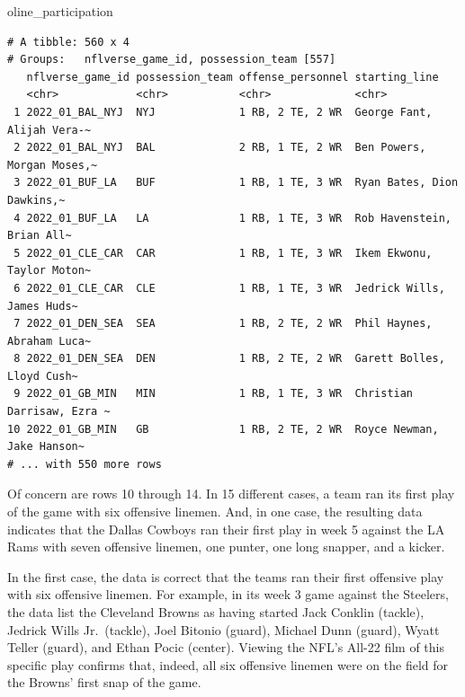 \documentclass[
  letterpaper,
]{krantz}
\newenvironment{Shaded}{\begin{snugshade}}{\end{snugshade}}
\newcommand{\NormalTok}[1]{\textcolor[rgb]{0.00,0.23,0.31}{#1}}
\begin{document}
\begin{Shaded}
\begin{Highlighting}[]
\NormalTok{oline\_participation}
\end{Highlighting}
\end{Shaded}

\begin{verbatim}
# A tibble: 560 x 4
# Groups:   nflverse_game_id, possession_team [557]
   nflverse_game_id possession_team offense_personnel starting_line             
   <chr>            <chr>           <chr>             <chr>                     
 1 2022_01_BAL_NYJ  NYJ             1 RB, 2 TE, 2 WR  George Fant, Alijah Vera-~
 2 2022_01_BAL_NYJ  BAL             2 RB, 1 TE, 2 WR  Ben Powers, Morgan Moses,~
 3 2022_01_BUF_LA   BUF             1 RB, 1 TE, 3 WR  Ryan Bates, Dion Dawkins,~
 4 2022_01_BUF_LA   LA              1 RB, 1 TE, 3 WR  Rob Havenstein, Brian All~
 5 2022_01_CLE_CAR  CAR             1 RB, 1 TE, 3 WR  Ikem Ekwonu, Taylor Moton~
 6 2022_01_CLE_CAR  CLE             1 RB, 1 TE, 3 WR  Jedrick Wills, James Huds~
 7 2022_01_DEN_SEA  SEA             1 RB, 2 TE, 2 WR  Phil Haynes, Abraham Luca~
 8 2022_01_DEN_SEA  DEN             1 RB, 2 TE, 2 WR  Garett Bolles, Lloyd Cush~
 9 2022_01_GB_MIN   MIN             1 RB, 1 TE, 3 WR  Christian Darrisaw, Ezra ~
10 2022_01_GB_MIN   GB              1 RB, 2 TE, 2 WR  Royce Newman, Jake Hanson~
# ... with 550 more rows
\end{verbatim}

Of concern are rows 10 through 14. In 15 different cases, a team ran its
first play of the game with six offensive linemen. And, in one case, the
resulting data indicates that the Dallas Cowboys ran their first play in
week 5 against the LA Rams with seven offensive linemen, one punter, one
long snapper, and a kicker.

In the first case, the data is correct that the teams ran their first
offensive play with six offensive linemen. For example, in its week 3
game against the Steelers, the data list the Cleveland Browns as having
started Jack Conklin (tackle), Jedrick Wills Jr.~(tackle), Joel Bitonio
(guard), Michael Dunn (guard), Wyatt Teller (guard), and Ethan Pocic
(center). Viewing the NFL's All-22 film of this specific play confirms
that, indeed, all six offensive linemen were on the field for the
Browns' first snap of the game.
\end{document}
